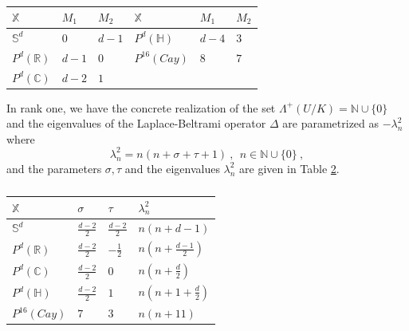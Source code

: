 \documentclass[12pt]{amsart}
\theoremstyle{definition}
\newcommand{\R}{\mathbb R}%
\newcommand{\C}{\mathbb C}%
\newcommand{\N}{\mathbb N}%
\newcommand{\Sb}{\mathbb S}%
\newcommand{\X}{\mathbb X}%
\newcommand{\Hb}{\mathbb H}%
\numberwithin{equation}{section}
\begin{document}
\begingroup

\setlength{\tabcolsep}{10pt} %
\renewcommand{\arraystretch}{1.5} %
\begin{table}[H]
\centering
\begin{tabular}{ ||p{1.7cm}|| p{1cm} | p{1cm} || p{1.7cm}|| p{1cm} | p{1cm}| }
 \hline
 $\X$ & $M_1$ & $M_2$ & $\X$ & $M_1$ & $M_2$ \\
 \hline 
$\Sb^d$   & $0$   & $d-1$ & $P^d(\Hb)$ & $d-4$ & \:\:$3$  \\
$P^d(\R)$ & $d-1$   & \:\:$0$ & $P^{16}(Cay)$ & \:\:$8$ & \:\:$7$ \\
$P^d(\C)$ & $d-2$  & \:\:$1$ & & &   \\
\hline
\end{tabular}

\medskip

\caption{}
\label{table:1}
\end{table}
\endgroup

In rank one, we have the concrete realization of the set $\Lambda^+(U/K)=\N \cup \{0\}$ and the eigenvalues of the Laplace-Beltrami operator $\Delta$ are parametrized as $-\lambda^2_n$ where
\begin{equation} \label{rank1_eigenvalue_form} 
\lambda^2_n =n(n+\sigma+\tau+1)\:,\:\:n \in \N \cup \{0\}\:,
\end{equation}  
and the parameters $\sigma, \tau$ and the eigenvalues $\lambda^2_n$ are given in Table \ref{table:2}.

\begingroup

\setlength{\tabcolsep}{10pt} %
\renewcommand{\arraystretch}{1.5} %
\begin{table}[h!]
\centering
\begin{tabular}{ ||p{1.7cm}|| p{1cm}| p{1cm}| p{2.3cm}|  }
 \hline
 $\X$ & $\sigma$ & $\tau$ & $\lambda^2_n$\\
 \hline 
$\Sb^d$   & $\frac{d-2}{2}$   & $\frac{d-2}{2}$ & $n(n+d-1)$ \\
$P^d(\R)$ & $\frac{d-2}{2}$   & $-\frac{1}{2}$  & $n\left(n+\frac{d-1}{2}\right)$ \\
$P^d(\C)$ & $\frac{d-2}{2}$  & \:\:$0$  & $n\left(n+\frac{d}{2}\right)$ \\
$P^d(\Hb)$ & $\frac{d-2}{2}$ & \:\:$1$ & $n\left(n+1+\frac{d}{2}\right)$   \\
$P^{16}(Cay)$ & \:\:$7$ & \:\:$3$  & $n(n+11)$ \\
\hline
\end{tabular}

\medskip

\caption{}
\label{table:2}
\end{table}
\endgroup
\end{document}
